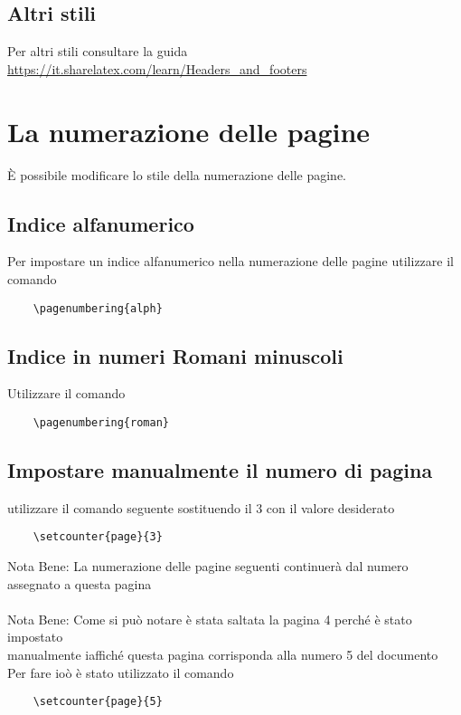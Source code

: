 \documentclass[a4paper, 12pt]{article}
\begin{document}
\subsection{Altri stili}

Per altri stili consultare la guida \url{https://it.sharelatex.com/learn/Headers_and_footers}



\vspace{1cm}

\section{La numerazione delle pagine}

È possibile modificare lo stile della numerazione delle pagine.

\subsection{Indice alfanumerico}

Per impostare un indice alfanumerico nella numerazione delle pagine utilizzare il comando
\begin{verbatim}
    \pagenumbering{alph}
\end{verbatim}

\subsection{Indice in numeri Romani minuscoli}

Utilizzare il comando
\begin{verbatim}
    \pagenumbering{roman}
\end{verbatim}

\subsection{Impostare manualmente il numero di pagina}

utilizzare il comando seguente sostituendo il 3 con il valore desiderato
\begin{verbatim}
    \setcounter{page}{3}
\end{verbatim}

Nota Bene: La numerazione delle pagine seguenti continuerà dal numero\\ assegnato a questa pagina
\\\\
Nota Bene: Come si può notare è stata saltata la pagina 4 perché è stato impostato\\ manualmente iaffiché questa pagina corrisponda alla numero 5 del documento\\Per fare ioò è stato utilizzato il comando
\begin{verbatim}
    \setcounter{page}{5}
\end{verbatim}
\end{document}
